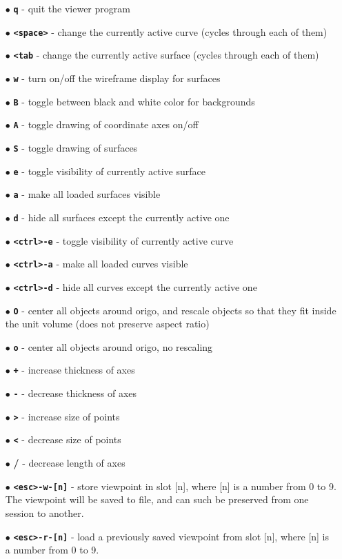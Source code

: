 \begin{itemize}
\item[$\bullet$] \textbf{\protect \Verb/q/} - quit the viewer program
\item[$\bullet$] \textbf{\protect \Verb/<space>/} - change the currently active curve 
(cycles through each of them)
\item[$\bullet$] \textbf{\protect \Verb/<tab/} - change the currently active surface 
(cycles through each of them)
\item[$\bullet$] \textbf{\protect \Verb/w/} - turn on/off the wireframe display for surfaces
\item[$\bullet$] \textbf{\protect \Verb/B/} - toggle between black and white color for backgrounds
\item[$\bullet$] \textbf{\protect \Verb/A/} - toggle drawing of coordinate axes on/off
\item[$\bullet$] \textbf{\protect \Verb/S/} - toggle drawing of surfaces
\item[$\bullet$] \textbf{\protect \Verb/e/} - toggle visibility of currently active surface
\item[$\bullet$] \textbf{\protect \Verb/a/} - make all loaded surfaces visible
\item[$\bullet$] \textbf{\protect \Verb/d/} - hide all surfaces except the currently active one
\item[$\bullet$] \textbf{\protect \Verb/<ctrl>-e/} - toggle visibility of currently active curve
\item[$\bullet$] \textbf{\protect \Verb/<ctrl>-a/} - make all loaded curves visible
\item[$\bullet$] \textbf{\protect \Verb/<ctrl>-d/} - hide all curves except the currently active one
\item[$\bullet$] \textbf{\protect \Verb/O/} - center all objects around origo, and rescale objects
so that they fit inside the unit volume (does not preserve aspect ratio)
\item[$\bullet$] \textbf{\protect \Verb/o/} - center all objects around origo, no rescaling
\item[$\bullet$] \textbf{\protect \Verb/+/} - increase thickness of axes
\item[$\bullet$] \textbf{\protect \Verb/-/} - decrease thickness of axes
\item[$\bullet$] \textbf{\protect \Verb/>/} - increase size of points
\item[$\bullet$] \textbf{\protect \Verb/</} - decrease size of points
\item[$\bullet$] \textbf{\protect \Verb///} - decrease length of axes
\item[$\bullet$] \textbf{\protect \Verb/<esc>-w-[n]/} - store viewpoint in slot [n], where [n]
is a number from 0 to 9.  The viewpoint will be saved to file, and can such be preserved
from one session to another.
\item[$\bullet$] \textbf{\protect \Verb/<esc>-r-[n]/} - load a previously saved viewpoint from
slot [n], where [n] is a number from 0 to 9.
\end{itemize}
